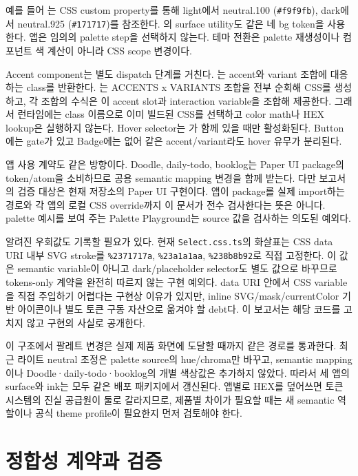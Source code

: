 \documentclass[11pt,titlepage]{article}
\begin{document}
예를 들어 는 CSS custom property를 통해 light에서 neutral.100 (\texttt{\#f9f9fb}), dark에서 neutral.925 (\texttt{\#171717})를 참조한다. 의 surface utility도 같은 네 bg token을 사용한다. 앱은 임의의 palette step을 선택하지 않는다. 테마 전환은 palette 재생성이나 컴포넌트 색 계산이 아니라 CSS scope 변경이다\cite{semantics,theme,tokenindex,utility}.

Accent component는 별도 dispatch 단계를 거친다. 는 accent와 variant 조합에 대응하는 class를 반환한다. 는 ACCENTS x VARIANTS 조합을 전부 순회해 CSS를 생성하고, 각 조합의 수식은 이 accent slot과 interaction variable을 조합해 제공한다. 그래서 런타임에는 class 이름으로 이미 빌드된 CSS를 선택하고 color math나 HEX lookup은 실행하지 않는다. Hover selector는 가 함께 있을 때만 활성화된다. Button에는 gate가 있고 Badge에는 없어 같은 accent/variant라도 hover 유무가 분리된다\cite{profile,emitter,resolver}.

앱 사용 계약도 같은 방향이다. Doodle, daily-todo, booklog는 Paper UI package의 token/atom을 소비하므로 공용 semantic mapping 변경을 함께 받는다. 다만 보고서의 검증 대상은 현재 저장소의 Paper UI 구현이다. 앱이 package를 실제 import하는 경로와 각 앱의 로컬 CSS override까지 이 문서가 전수 검사한다는 뜻은 아니다. palette 예시를 보여 주는 Palette Playground는 source 값을 검사하는 의도된 예외다.

알려진 우회값도 기록할 필요가 있다. 현재 \texttt{Select.css.ts}의 화살표는 CSS data URI 내부 SVG stroke를 \texttt{\%2371717a}, \texttt{\%23a1a1aa}, \texttt{\%238b8b92}로 직접 고정한다. 이 값은 semantic variable이 아니고 dark/placeholder selector도 별도 값으로 바꾸므로 tokens-only 계약을 완전히 따르지 않는 구현 예외다. data URI 안에서 CSS variable을 직접 주입하기 어렵다는 구현상 이유가 있지만, inline SVG/mask/currentColor 기반 아이콘이나 별도 토큰 구동 자산으로 옮겨야 할 debt다. 이 보고서는 해당 코드를 고치지 않고 구현의 사실로 공개한다.

이 구조에서 팔레트 변경은 실제 제품 화면에 도달할 때까지 같은 경로를 통과한다. 최근 라이트 neutral 조정은 palette source의 hue/chroma만 바꾸고, semantic mapping이나 Doodle·daily-todo·booklog의 개별 색상값은 추가하지 않았다. 따라서 세 앱의 surface와 ink는 모두 같은 배포 패키지에서 갱신된다. 앱별로 HEX를 덮어쓰면 토큰 시스템의 진실 공급원이 둘로 갈라지므로, 제품별 차이가 필요할 때는 새 semantic 역할이나 공식 theme profile이 필요한지 먼저 검토해야 한다.

\section{정합성 계약과 검증}
\end{document}
